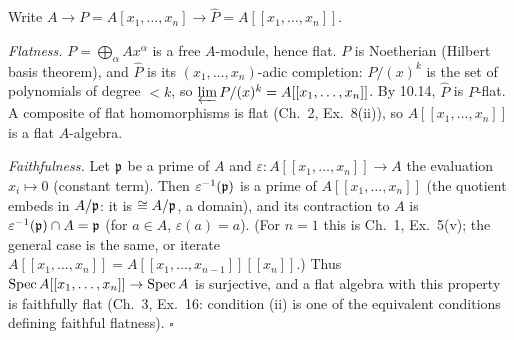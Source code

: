 \documentclass[11pt]{article}
\begin{document}
\pf
Write $A\to P=A[x_1,\dots,x_n]\to\hat P=A[[x_1,\dots,x_n]]$.

\emph{Flatness.} $P=\bigoplus_\alpha Ax^\alpha$ is a free $A$-module, hence flat. $P$ is Noetherian (Hilbert basis theorem), and $\hat P$ is its $(x_1,\dots,x_n)$-adic completion: $P/(x)^k$ is the set of polynomials of degree $<k$, so $\varprojlim P/(x)^k=A[[x_1,\dots,x_n]]$. By 10.14, $\hat P$ is $P$-flat. A composite of flat homomorphisms is flat (Ch.~2, Ex.~8(ii)), so $A[[x_1,\dots,x_n]]$ is a flat $A$-algebra.

\emph{Faithfulness.} Let $\mathfrak p$ be a prime of $A$ and $\varepsilon:A[[x_1,\dots,x_n]]\to A$ the evaluation $x_i\mapsto0$ (constant term). Then $\varepsilon^{-1}(\mathfrak p)$ is a prime of $A[[x_1,\dots,x_n]]$ (the quotient embeds in $A/\mathfrak p$: it is $\cong A/\mathfrak p$, a domain), and its contraction to $A$ is $\varepsilon^{-1}(\mathfrak p)\cap A=\mathfrak p$ (for $a\in A$, $\varepsilon(a)=a$). (For $n=1$ this is Ch.~1, Ex.~5(v); the general case is the same, or iterate $A[[x_1,\dots,x_n]]=A[[x_1,\dots,x_{n-1}]][[x_n]]$.) Thus $\operatorname{Spec} A[[x_1,\dots,x_n]]\to\operatorname{Spec} A$ is surjective, and a flat algebra with this property is faithfully flat (Ch.~3, Ex.~16: condition (ii) is one of the equivalent conditions defining faithful flatness). \hfill$\square$
\end{document}
